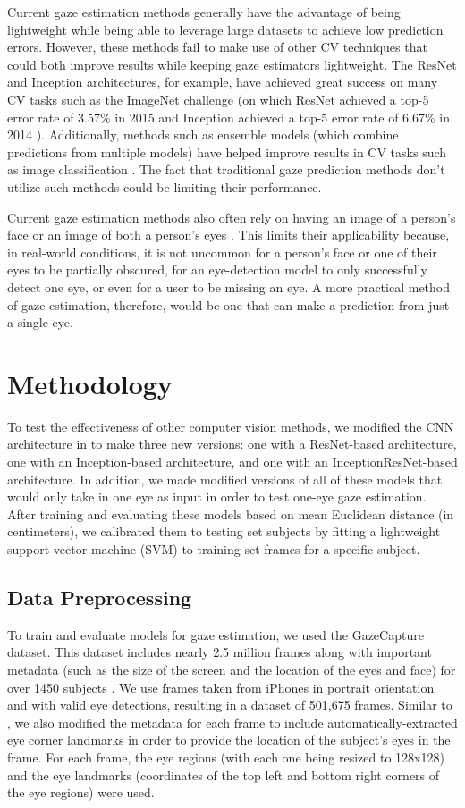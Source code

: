 \documentclass{article}
\begin{document}
Current gaze estimation methods generally have the advantage of being lightweight while being able to leverage large datasets to achieve low prediction errors. However, these methods fail to make use of other CV techniques that could both improve results while keeping gaze estimators lightweight. The ResNet and Inception architectures, for example, have achieved great success on many CV tasks such as the ImageNet challenge (on which ResNet achieved a top-5 error rate of 3.57\% in 2015 \cite{resnetpaper} and Inception achieved a top-5 error rate of 6.67\% in 2014 \cite{inceptionpaper}). Additionally, methods such as ensemble models (which combine predictions from multiple models) have helped improve results in CV tasks such as image classification \cite{ensemblepaper}. The fact that traditional gaze prediction methods don't utilize such methods could be limiting their performance.

Current gaze estimation methods also often rely on having an image of a person's face \cite{mitpaper} or an image of both a person's eyes \cite{googlepaper}. This limits their applicability because, in real-world conditions, it is not uncommon for a person's face or one of their eyes to be partially obscured, for an eye-detection model to only successfully detect one eye, or even for a user to be missing an eye. A more practical method of gaze estimation, therefore, would be one that can make a prediction from just a single eye.

\section{Methodology}
To test the effectiveness of other computer vision methods, we modified the CNN architecture in \cite{googlepaper} to make three new versions: one with a ResNet-based architecture, one with an Inception-based architecture, and one with an InceptionResNet-based architecture. In addition, we made modified versions of all of these models that would only take in one eye as input in order to test one-eye gaze estimation. After training and evaluating these models based on mean Euclidean distance (in centimeters), we calibrated them to testing set subjects by fitting a lightweight support vector machine (SVM) to training set frames for a specific subject.
\subsection{Data Preprocessing}
To train and evaluate models for gaze estimation, we used the GazeCapture dataset. This dataset includes nearly 2.5 million frames along with important metadata (such as the size of the screen and the location of the eyes and face) for over 1450 subjects \cite{mitpaper}. We use frames taken from iPhones in portrait orientation and with valid eye detections, resulting in a dataset of 501,675 frames. Similar to \cite{googlepaper}, we also modified the metadata for each frame to include automatically-extracted eye corner landmarks in order to provide the location of the subject's eyes in the frame. For each frame, the eye regions (with each one being resized to 128x128) and the eye landmarks (coordinates of the top left and bottom right corners of the eye regions) were used.
\end{document}

